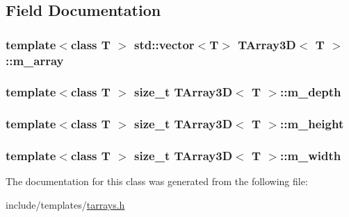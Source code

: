 \subsection{Field Documentation}
\hypertarget{classTArray3D_acb49e26adbdbf0183b7876731a930345}{
\subsubsection[{m\_\-array}]{\setlength{\rightskip}{0pt plus 5cm}template$<$class T $>$ std::vector$<$T$>$ {\bf TArray3D}$<$ T $>$::{\bf m\_\-array}}}
\label{classTArray3D_acb49e26adbdbf0183b7876731a930345}
\hypertarget{classTArray3D_a7d1123fcaf6870716640855c3a98aa83}{
\subsubsection[{m\_\-depth}]{\setlength{\rightskip}{0pt plus 5cm}template$<$class T $>$ size\_\-t {\bf TArray3D}$<$ T $>$::{\bf m\_\-depth}}}
\label{classTArray3D_a7d1123fcaf6870716640855c3a98aa83}
\hypertarget{classTArray3D_a8560a24b0a789251c9093fa98b86dd09}{
\subsubsection[{m\_\-height}]{\setlength{\rightskip}{0pt plus 5cm}template$<$class T $>$ size\_\-t {\bf TArray3D}$<$ T $>$::{\bf m\_\-height}}}
\label{classTArray3D_a8560a24b0a789251c9093fa98b86dd09}
\hypertarget{classTArray3D_a5834f0bd1cd05ab379e50dd4227a880b}{
\subsubsection[{m\_\-width}]{\setlength{\rightskip}{0pt plus 5cm}template$<$class T $>$ size\_\-t {\bf TArray3D}$<$ T $>$::{\bf m\_\-width}}}
\label{classTArray3D_a5834f0bd1cd05ab379e50dd4227a880b}


The documentation for this class was generated from the following file:\begin{DoxyCompactItemize}
\item 
include/templates/\hyperlink{tarrays_8h}{tarrays.h}\end{DoxyCompactItemize}
